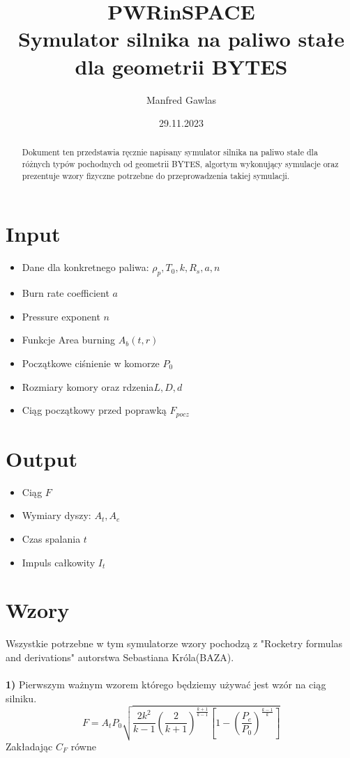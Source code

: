 \documentclass{article}
\title{PWRinSPACE\\Symulator silnika na paliwo stałe dla geometrii BYTES}
\author{Manfred Gawlas}
\date{29.11.2023}
\begin{document}
\maketitle
\begin{abstract}
Dokument ten przedstawia ręcznie napisany symulator silnika na paliwo stałe dla różnych typów pochodnych od geometrii BYTES, algortym wykonujący symulacje oraz prezentuje wzory fizyczne potrzebne do przeprowadzenia takiej symulacji.
    \end{abstract}
\section{Input}
\begin{itemize}
\item Dane dla konkretnego paliwa: $\rho_p, T_0, k, R_s, a, n$
\item Burn rate coefficient $a$
\item Pressure exponent $n$
\item Funkcje Area burning $A_b(t, r)$
\item Początkowe ciśnienie w komorze $P_0$
\item Rozmiary komory oraz rdzenia$L, D, d$
\item Ciąg początkowy przed poprawką $F_{pocz}$
\end{itemize}

\section{Output}
\begin{itemize}
\item Ciąg $F$
\item Wymiary dyszy: $A_t, A_e$
\item Czas spalania $t$
\item Impuls całkowity $I_t$
\end{itemize}

\section{Wzory}
Wszystkie potrzebne w tym symulatorze wzory pochodzą z "Rocketry formulas and derivations" autorstwa Sebastiana Króla(BAZA).\\\\
\textbf{1)} Pierwszym ważnym wzorem którego będziemy używać jest wzór na ciąg silniku.
\begin{equation} F=A_tP_0\sqrt{\frac{2k^2}{k-1}\left(\frac{2}{k+1}\right)^{\frac{k+1}{k-1}}\left[1-\left(\frac{P_e}{P_0}\right)^{\frac{k-1}{k}}\right]} \end{equation}
Zakładając $C_F$ równe
\end{document}
